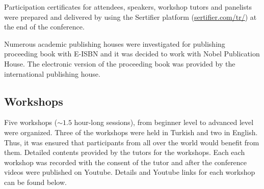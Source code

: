 \noindent Participation certificates for attendees, speakers, workshop tutors and panelists were prepared and delivered by using the Sertifier platform (\url{sertifier.com/tr/}) at the end of the conference.

\noindent Numerous academic publishing houses were investigated for publishing proceeding book with E-ISBN and it was decided to work with Nobel Publication House. The electronic version of the proceeding book was provided by the international publishing house. 

\subsection{Workshops}

Five workshops ($\sim 1.5$ hour-long sessions), from beginner level to advanced level were organized. Three of the workshops were held in Turkish and two in English. Thus, it was ensured that participants from all over the world would benefit from them. Detailed contents provided by the tutors for the workshops. Each each workshop was recorded with the consent of the tutor and after the conference videos were published on Youtube. Details and Youtube links for each workshop can be found below. 

